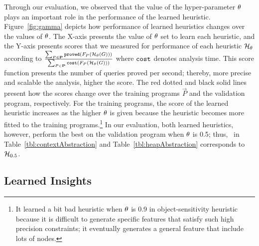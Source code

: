 Through our evaluation, we observed that the value of the hyper-parameter ${\theta}$ plays an important role in the performance of the learned heuristic.
Figure~\ref{fig:gamma} depicts how performance of learned heuristics changes over the values of  ${\theta}$.
The X-axis presents the value of ${\theta}$ set to learn each heuristic, and
the Y-axis presents scores that we measured for performance of each heuristic $\mathcal{H}_{{\theta}}$ according to
${\sum_{P\in\mathbf{P}}{\tt proved}(F_P(\mathcal{H}_{{\theta}}(G)))}\over{\sum_{P\in\mathbf{P}}
  {\tt cost}(F_P(\mathcal{H}_{{\theta}}(G)))}$ where ${\tt cost}$ denotes analysis time.
This score function presents the number of queries proved per second; thereby, more precise and scalable the analysis,
higher the score.
The red dotted and black solid lines present how the scores change over
the training programs $\vec{P}$ %
and the validation program, respectively.
For the training programs, the score of the learned heuristic increases as the higher ${\theta}$ is given
because the heuristic becomes more fitted to the training programs.\footnote{It learned a bit bad heuristic when ${\theta}$ is 0.9 in
  object-sensitivity heuristic because it is
difficult to generate specific features that satisfy such high precision
constraints; it eventually generates a general feature that include lots
of nodes.}
In our evaluation, both learned heuristics, however, perform the best on the validation program when ${\theta}$ is 0.5;
thus, \OurCtx~in Table~\ref{tbl:contextAbstraction} and Table~\ref{tbl:heapAbstraction} corresponds to $\mathcal{H}_{0.5}$.










\subsection{Learned Insights}

